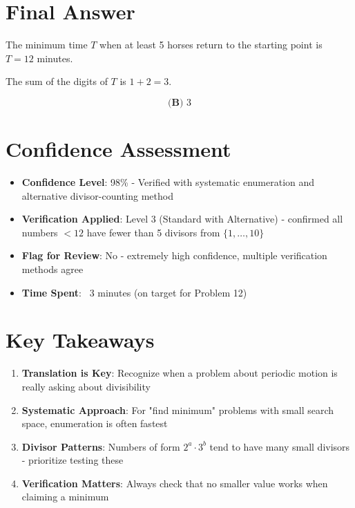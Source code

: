 \documentclass[]{article}
\begin{document}
\section*{Final Answer}
The minimum time $T$ when at least 5 horses return to the starting point is $T = 12$ minutes.

The sum of the digits of $T$ is $1 + 2 = 3$.

\[\boxed{\textbf{(B) } 3}\]

\section*{Confidence Assessment}
\begin{itemize}[leftmargin=*]
    \item \textbf{Confidence Level}: 98\% - Verified with systematic enumeration and alternative divisor-counting method
    \item \textbf{Verification Applied}: Level 3 (Standard with Alternative) - confirmed all numbers $< 12$ have fewer than 5 divisors from $\{1,\ldots,10\}$
    \item \textbf{Flag for Review}: No - extremely high confidence, multiple verification methods agree
    \item \textbf{Time Spent}: ~3 minutes (on target for Problem 12)
\end{itemize}

\section*{Key Takeaways}
\begin{enumerate}
    \item \textbf{Translation is Key}: Recognize when a problem about periodic motion is really asking about divisibility
    \item \textbf{Systematic Approach}: For "find minimum" problems with small search space, enumeration is often fastest
    \item \textbf{Divisor Patterns}: Numbers of form $2^a \cdot 3^b$ tend to have many small divisors - prioritize testing these
    \item \textbf{Verification Matters}: Always check that no smaller value works when claiming a minimum
\end{enumerate}
\end{document}
